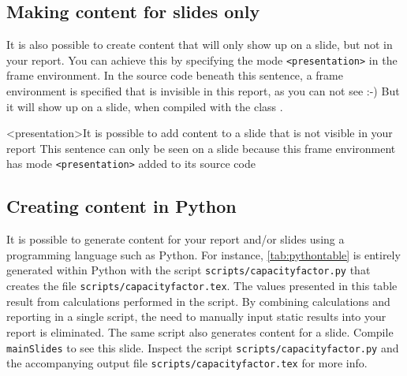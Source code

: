 \subsection{Making content for slides only}
It is also possible to create content that will only show up on a slide, but not in your report. You can achieve this by specifying the mode \texttt{<presentation>} in the frame environment. In the source code beneath this sentence, a frame environment is specified that is invisible in this report, as you can not see :-) But it will show up on a slide, when compiled with the class .

\begin{frame}<presentation>{It is possible to add content to a slide that is not visible in your report}
This sentence can only be seen on a slide because this frame environment has mode \texttt{<presentation>} added to its source code
\end{frame}

\subsection{Creating content in Python}
It is possible to generate content for your report and/or slides using a programming language such as Python. For instance, \cref{tab:pythontable} is entirely generated within Python with the script \texttt{scripts/capacityfactor.py} that creates the file \texttt{scripts/capacityfactor.tex}. The values presented in this table result from calculations performed in the script. By combining calculations and reporting in a single script, the need to manually input static results into your report is eliminated. The same script also generates content for a slide. Compile \texttt{mainSlides} to see this slide. Inspect the script \texttt{scripts/capacityfactor.py} and the accompanying output file \texttt{scripts/capacityfactor.tex} for more info.


